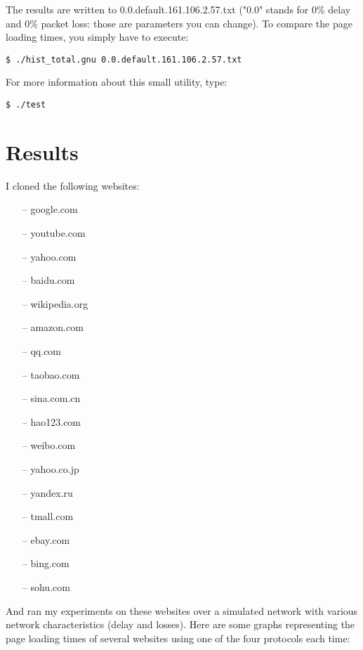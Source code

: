 \documentclass[12pt, notitlepage]{article}
\begin{document}
The results are written to 0.0.default.161.106.2.57.txt ("0.0" stands for
0\% delay and 0\% packet loss: those are parameters you can change). To
compare the page loading times, you simply have to execute:
\begin{lstlisting}
$ ./hist_total.gnu 0.0.default.161.106.2.57.txt
\end{lstlisting}
For more information about this small utility, type:
\begin{lstlisting}
$ ./test
\end{lstlisting}

\newpage

\section{Results}
I cloned the following websites:
\begin{itemize}[noitemsep]
	\item[--] google.com
	\item[--] youtube.com
	\item[--] yahoo.com
	\item[--] baidu.com
	\item[--] wikipedia.org
	\item[--] amazon.com
	\item[--] qq.com
	\item[--] taobao.com
	\item[--] sina.com.cn
	\item[--] hao123.com
	\item[--] weibo.com
	\item[--] yahoo.co.jp
	\item[--] yandex.ru
	\item[--] tmall.com
	\item[--] ebay.com
	\item[--] bing.com
	\item[--] sohu.com
\end{itemize}
And ran my experiments on these websites over a simulated network with 
various network characteristics (delay and losses).
Here are some graphs representing the page loading times of several
websites using one of the four protocols each time:
\newpage

\end{document}
